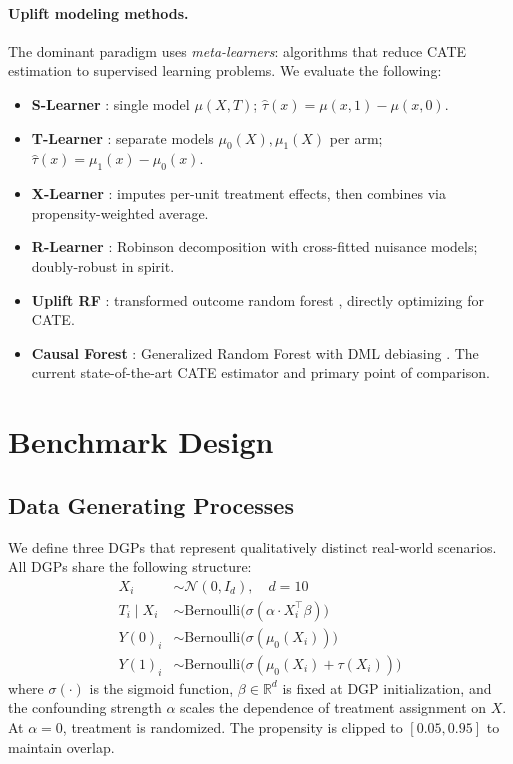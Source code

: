 \documentclass[10pt]{article}
\newcommand{\Y}[1]{Y(#1)}
\newcommand{\RR}{\mathbb{R}}
\begin{document}
\paragraph{Uplift modeling methods.}
The dominant paradigm uses \emph{meta-learners}: algorithms that reduce CATE
estimation to supervised learning problems. We evaluate the following:
%
\begin{itemize}[topsep=2pt,itemsep=1pt]
  \item \textbf{S-Learner} \citep{hill2011bayesian}: single model $\mu(X, T)$;
    $\hat\tau(x) = \mu(x, 1) - \mu(x, 0)$.
  \item \textbf{T-Learner} \citep{kunzel2019metalearners}: separate models
    $\mu_0(X), \mu_1(X)$ per arm; $\hat\tau(x) = \mu_1(x) - \mu_0(x)$.
  \item \textbf{X-Learner} \citep{kunzel2019metalearners}: imputes per-unit
    treatment effects, then combines via propensity-weighted average.
  \item \textbf{R-Learner} \citep{nie2021quasiOracle}: Robinson decomposition
    with cross-fitted nuisance models; doubly-robust in spirit.
  \item \textbf{Uplift RF} \citep{rzepakowski2012decision}: transformed outcome
    random forest \citep{athey2016recursive}, directly optimizing for CATE.
  \item \textbf{Causal Forest} \citep{wager2018estimation}: Generalized Random
    Forest with DML debiasing \citep{chernozhukov2018double}. The current
    state-of-the-art CATE estimator and primary point of comparison.
\end{itemize}

\section{Benchmark Design}
\label{sec:benchmark}

\subsection{Data Generating Processes}
\label{sec:dgp}

We define three DGPs that represent qualitatively distinct real-world scenarios.
All DGPs share the following structure:
%
\begin{align}
  X_i &\sim \mathcal{N}(0, I_d), \quad d = 10 \\
  T_i \mid X_i &\sim \text{Bernoulli}\bigl(\sigma(\alpha \cdot X_i^\top \beta)\bigr) \label{eq:propensity} \\
  \Y{0}_i &\sim \text{Bernoulli}\bigl(\sigma(\mu_0(X_i))\bigr) \\
  \Y{1}_i &\sim \text{Bernoulli}\bigl(\sigma(\mu_0(X_i) + \tau(X_i))\bigr)
\end{align}
%
where $\sigma(\cdot)$ is the sigmoid function, $\beta \in \RR^d$ is fixed at
DGP initialization, and the confounding strength $\alpha$ scales the dependence
of treatment assignment on $X$. At $\alpha = 0$, treatment is randomized. The
propensity is clipped to $[0.05, 0.95]$ to maintain overlap.
\end{document}
